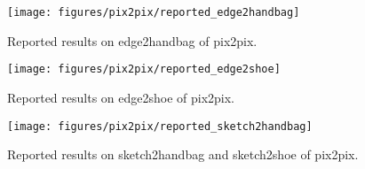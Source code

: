\begin{figure}
	\texttt{[image: figures/pix2pix/reported\_edge2handbag]}
	\caption{\label{pix2pix_edge2handbag}Reported results on edge2handbag of pix2pix.}
\end{figure}
\begin{figure}
	\texttt{[image: figures/pix2pix/reported\_edge2shoe]}
	\caption{\label{pix2pix_edge2shoe}Reported results on edge2shoe of pix2pix.}
\end{figure}

\begin{figure}
	\texttt{[image: figures/pix2pix/reported\_sketch2handbag]}
	\caption{\label{pix2pix_sketch2shoeNhandbag}Reported results on sketch2handbag and sketch2shoe of pix2pix.}
\end{figure}







